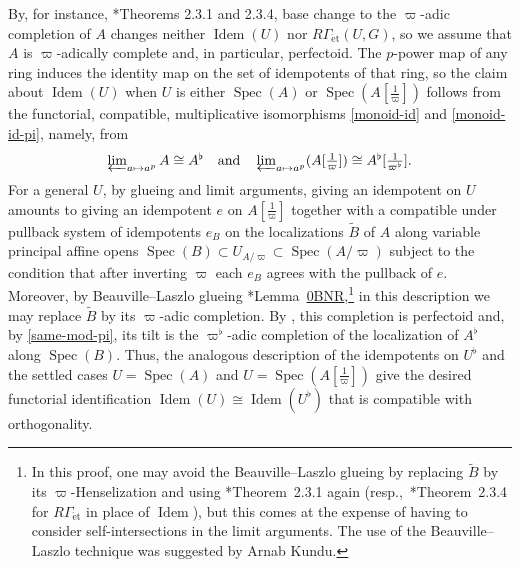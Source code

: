 \documentclass[11pt, reqno]{amsart}
\DeclareMathOperator{\Spec}{Spec}		%
\newcommand{\et}{\mathrm{\acute{e}t}}	%
\DeclareMathOperator{\Idem}{\mathrm{Idem}}	%
\newcommand{\wt}{\widetilde}
\providecommand{\f}[2]{\frac{#1}{#2}}
\providecommand{\qxq}[1]{\quad\text{#1}\quad}
\newcommand{\tst}{\textstyle}
\numberwithin{equation}{numberingbase}
\theoremstyle{thms}
\theoremstyle{claims}
\theoremstyle{defs}
\theoremstyle{thms}
\theoremstyle{defs}
\theoremstyle{subsection-tweak}
\theoremstyle{subsection-tweak}
\begin{document}
By, for instance, \cite{BC19}*{Theorems 2.3.1 and 2.3.4}, base change to the $\varpi$-adic completion of $A$ changes neither $\Idem(U)$ nor $R\Gamma_\et(U, G)$, so we assume that $A$ is $\varpi$-adically complete and, in particular, perfectoid. The $p$-power map of any ring induces the identity map on the set of idempotents of that ring, so the claim about $\Idem(U)$ when $U$ is either $\Spec(A)$ or $\Spec(A[\f 1\varpi])$ follows from the functorial, compatible, multiplicative isomorphisms \eqref{monoid-id} and \eqref{monoid-id-pi}, namely, from
\[
\tst \varprojlim_{a \mapsto a^p} A \cong A^\flat \qxq{and} \varprojlim_{a \mapsto a^p} (A[\f 1\varpi]) \cong A^\flat[\f 1 {\varpi^\flat}].
\]
For a general $U$, by glueing and limit arguments, giving an idempotent on $U$ amounts to giving an idempotent $e$ on $A[\f 1\varpi]$ together with a compatible under pullback system of idempotents $e_B$ on the localizations $\wt{B}$ of $A$ along variable principal affine opens $\Spec(B) \subset U_{A/\varpi} \subset \Spec(A/\varpi)$ subject to the condition that after inverting $\varpi$ each $e_B$ agrees with the pullback of $e$. Moreover, by Beauville--Laszlo glueing \cite{SP}*{Lemma~\href{https://stacks.math.columbia.edu/tag/0BNR}{0BNR}},\footnote{In this proof, one may avoid the Beauville--Laszlo glueing by replacing $\wt{B}$ by its $\varpi$-Henselization and using \cite{BC19}*{Theorem~2.3.1} again (resp.,~\cite{BC19}*{Theorem~2.3.4} for $R\Gamma_\et$ in place of $\Idem$), but this comes at the expense of having to consider self-intersections in the limit arguments. The use of the Beauville--Laszlo technique was suggested by Arnab Kundu.} in this description we may replace $\wt{B}$ by its $\varpi$-adic completion. By , this completion is perfectoid and, by \eqref{same-mod-pi}, its tilt is the $\varpi^\flat$-adic completion of %
the localization of $A^\flat$ along $\Spec(B)$. Thus, the analogous description of the idempotents on $U^\flat$ and the settled cases $U = \Spec(A)$ and $U = \Spec(A[\f 1\varpi])$ %
give the desired functorial identification $\Idem(U) \cong \Idem(U^\flat)$ that is compatible with orthogonality.  
\end{document}
